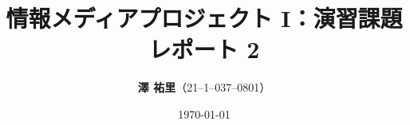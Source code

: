 \documentclass[dvipdfmx]{jsarticle}
\begin{document}
\title{\vspace{10zw}情報メディアプロジェクト I：演習課題レポート 2\\}
\date{\today} %
\author{\Large{\textbf{澤 \/ 祐里}}（21--1--037--0801）} %
 
\thispagestyle{empty}
\maketitle
\thispagestyle{empty}
\clearpage

\setcounter{page}{1}
\setcounter{secnumdepth}{4}
\setcounter{tocdepth}{4}
\hypertarget{mokuji}{\tableofcontents}
\clearpage


\clearpage

%

%
\end{document}

